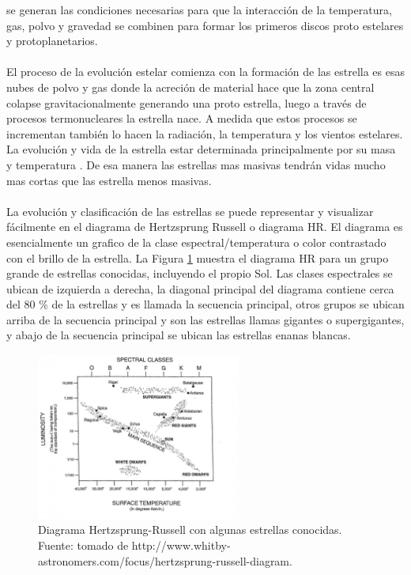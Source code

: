 \documentclass[12pt]{article}
\begin{document}
se generan las condiciones necesarias para que la interacción de la temperatura, gas, polvo y gravedad 
se combinen para formar los primeros discos proto estelares y protoplanetarios.\\
\\
El proceso de la evolución estelar comienza  con la formación de las estrella es esas nubes de polvo y 
gas donde la acreción de material hace que la zona central colapse gravitacionalmente generando una 
proto estrella, luego a través de procesos termonucleares la estrella nace. A medida que estos procesos 
se incrementan también lo hacen la radiación, la temperatura y los vientos estelares. La evolución y 
vida de la estrella estar determinada principalmente por su masa y temperatura \parencite{Whittet2022DustIT}. 
De esa manera las estrellas mas masivas tendrán vidas mucho mas cortas que las estrella menos masivas. \\
\\
La evolución y clasificación de las estrellas se puede representar y visualizar fácilmente en el diagrama 
de Hertzsprung Russell o 
diagrama HR. El diagrama es esencialmente un grafico de la clase espectral/temperatura o color 
contrastado con el brillo de la estrella. La Figura \ref{fig:diagrama_HR} muestra el diagrama HR para un 
grupo grande de estrellas conocidas, incluyendo el propio Sol. 
Las clases espectrales se ubican de izquierda a derecha, la diagonal principal del diagrama contiene 
cerca del 80 \% de la estrellas y es llamada la secuencia principal, otros grupos se ubican arriba de 
la secuencia principal y son las estrellas llamas gigantes o supergigantes, y abajo de la secuencia 
principal se ubican las estrellas enanas blancas.
\begin{figure}[H]
    \includegraphics[width=0.6\textwidth]{images/HR_diagram.jpg}
    \centering
    \caption{Diagrama Hertzsprung-Russell con algunas estrellas conocidas. 
    Fuente: tomado de http://www.whitby-astronomers.com/focus/hertzsprung-russell-diagram.}
    \label{fig:diagrama_HR}
\end{figure}
\end{document}
